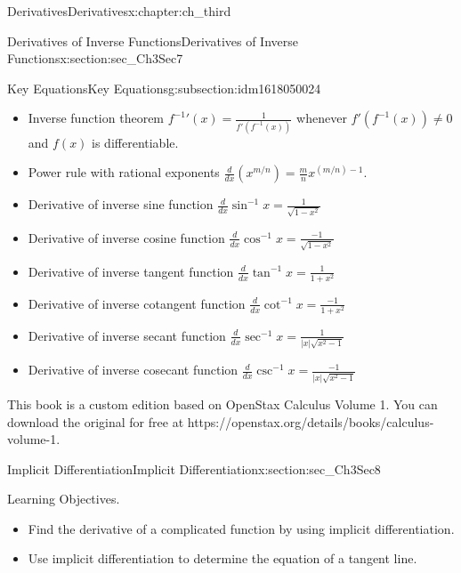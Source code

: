 \documentclass[oneside,10pt,]{book}
\numberwithin{equation}{section}
\begin{document}
\begin{chapterptx}{Derivatives}{}{Derivatives}{}{}{x:chapter:ch_third}
\begin{sectionptx}{Derivatives of Inverse Functions}{}{Derivatives of Inverse Functions}{}{}{x:section:sec_Ch3Sec7}
%
%
\typeout{************************************************}
\typeout{************************************************}
%
\begin{subsectionptx}{Key Equations}{}{Key Equations}{}{}{g:subsection:idm1618050024}
%
\begin{itemize}[label=\textbullet]
\item{}Inverse function theorem \({f^{-1}}'(x)=\frac{1}{f'(f^{-1}(x))}\) whenever \(f'(f^{-1}(x))\neq 0\) and \(f(x)\) is differentiable.%
\item{}Power rule with rational exponents \(\frac{d}{dx}(x^{m/n})=\frac{m}{n}x^{(m/n)-1}.\)%
\item{}Derivative of inverse sine function \(\frac{d}{dx} \sin^{-1}x=\frac{1}{\sqrt{1-x^2}}\)%
\item{}Derivative of inverse cosine function \(\frac{d}{dx} \cos^{-1}x=\frac{-1}{\sqrt{1-x^2}}\)%
\item{}Derivative of inverse tangent function \(\frac{d}{dx} \tan^{-1}x=\frac{1}{1+x^2}\)%
\item{}Derivative of inverse cotangent function \(\frac{d}{dx} \cot^{-1}x=\frac{-1}{1+x^2}\)%
\item{}Derivative of inverse secant function \(\frac{d}{dx} \sec^{-1}x=\frac{1}{|x|\sqrt{x^2-1}}\)%
\item{}Derivative of inverse cosecant function \(\frac{d}{dx} \csc^{-1}x=\frac{-1}{|x|\sqrt{x^2-1}}\)%
\end{itemize}
\end{subsectionptx}
This book is a custom edition based on OpenStax Calculus Volume 1. You can download the original for free at https:\slash{}\slash{}openstax.org\slash{}details\slash{}books\slash{}calculus-volume-1.%
\end{sectionptx}
%
%
\typeout{************************************************}
\typeout{************************************************}
%
\begin{sectionptx}{Implicit Differentiation}{}{Implicit Differentiation}{}{}{x:section:sec_Ch3Sec8}
\begin{introduction}{Learning Objectives.}%
%
\begin{itemize}[label=\textbullet]
\item{}Find the derivative of a complicated function by using implicit differentiation.%
\item{}Use implicit differentiation to determine the equation of a tangent line.%
\end{itemize}

\end{introduction}
\end{sectionptx}
\end{chapterptx}
\end{document}

